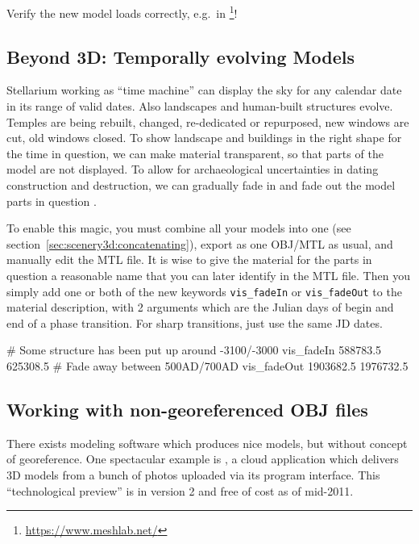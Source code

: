 Verify the new model loads correctly, e.g.\ in \footnote{\url{https://www.meshlab.net/}}!

\subsection{Beyond 3D: Temporally evolving Models}
\label{sec:scenery3d:Beyond3D}

Stellarium  working as ``time machine'' can display the sky for any calendar date in its range of valid dates. 
Also landscapes and human-built structures evolve. Temples are being rebuilt, changed, re-dedicated or repurposed, 
new windows are cut, old windows closed. 
To show landscape and buildings in the right shape for the time in question, we can make material transparent, 
so that parts of the model are not displayed.  To allow for archaeological uncertainties in dating 
construction and destruction, we can gradually fade in and fade out the model parts in question \citep{Zotti:SEAC2017}.

To enable this magic, you must combine all your models into one (see section~\ref{sec:scenery3d:concatenating}), 
export as one OBJ/MTL as usual, and manually edit the MTL file. It is wise to give the material 
for the parts in question a reasonable name that you can later identify in the MTL file.
Then you simply add one or both of the new keywords \texttt{vis\_fadeIn} or \texttt{vis\_fadeOut} 
to the material description,  with 2 arguments which are the Julian days of begin and end of a phase transition. 
For sharp transitions, just use the same JD dates.

\begin{configfile}
# Some structure has been put up around -3100/-3000
vis_fadeIn  588783.5 625308.5
# Fade away between 500AD/700AD
vis_fadeOut 1903682.5 1976732.5
\end{configfile}
 

\subsection{Working with non-georeferenced OBJ files}
\label{sec:scenery3d:NonGeoreferenced}


There exists modeling software which produces nice models, but without
concept of georeference. One spectacular example is ,
a cloud application which delivers 3D models from a bunch of photos
uploaded via its program interface. This ``technological preview'' is
in version 2 and free of cost as of mid-2011.

